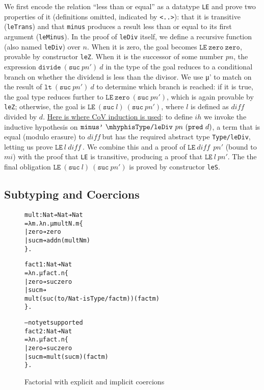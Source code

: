 \documentclass{article}
\newcommand{\difnd}{\ensuremath{di\!f\!f\ }}
\begin{document}
We first encode the relation ``less than or equal'' as a datatype \texttt{LE}
and prove two properties of it (definitions omitted, indicated by
\texttt{<..>}): that it is transitive (\texttt{leTrans}) and that
\texttt{minus} produces a result less than or equal to its first argument
(\texttt{leMinus}). In the proof of \texttt{leDiv} itself, we define a
recursive function (also named \texttt{leDiv}) over $n$. When it is
zero, the goal becomes \(\texttt{LE}\ \texttt{zero}\ \texttt{zero}\), provable
by constructor \texttt{leZ}. When it is the successor of some number $pn$, the
expression \(\texttt{divide}\ (\texttt{suc}\ pn')\ d\) in the type of the goal
reduces to a conditional branch on whether the dividend is less than the
divisor. We use μ' to match on the result of \(\texttt{lt}\ (\texttt{suc}\
pn')\ d\) to determine which branch is reached: if it is true, the
goal type reduces further to \(\texttt{LE}\ \texttt{zero}\ (\texttt{suc}\
pn')\), which is again provable by \texttt{leZ}; otherwise, the goal is
\(\texttt{LE}\ (\texttt{suc}\ l)\ (\texttt{suc}\ pn')\), where $l$ is defined
as \difnd divided by $d$.
\underline{Here is where CoV induction is used}: to define $ih$ we invoke the inductive hypothesis
on \(\texttt{minus'}\ \mhyph \texttt{isType/leDiv}\ pn\ (\texttt{pred}\ d)\), a term that is equal (modulo
erasure) to \difnd but has the required abstract type
\texttt{Type/leDiv}, letting us prove \(\texttt{LE}\ l\ \difnd\). We combine this and a
proof of \(\texttt{LE}\ \difnd\ pn'\) (bound to $mi$) with the proof
that \texttt{LE} is transitive, producing a proof that \(\texttt{LE}\ l\ pn'\). The
the final obligation \(\texttt{LE}\ (\texttt{suc}\ l)\ (\texttt{suc}\ pn')\)
is proved by constructor \texttt{leS}.

\subsection{Subtyping and Coercions}
\label{sec:subtyping-coercion}
\begin{figure}[h]
\begin{alltt}
mult : Nat ➔ Nat ➔ Nat
= λ m. λ n. μ multN. m \{
| zero ➔ zero
| suc m ➔ add n (multN m)
\}.

fact1 : Nat ➔ Nat
= λ n. μ fact. n \{
| zero ➔ suc zero
| suc m ➔
  mult (suc (to/Nat -isType/fact m)) (fact m)
\}.

-- not yet supported
fact2 : Nat ➔ Nat
= λ n. μ fact. n \{
| zero ➔ suc zero
| suc m ➔ mult (suc m) (fact m)
\}.
\end{alltt}
  \caption{Factorial with explicit and implicit coercions}
  \label{fig:ex-data-fact}
\end{figure}
\end{document}
